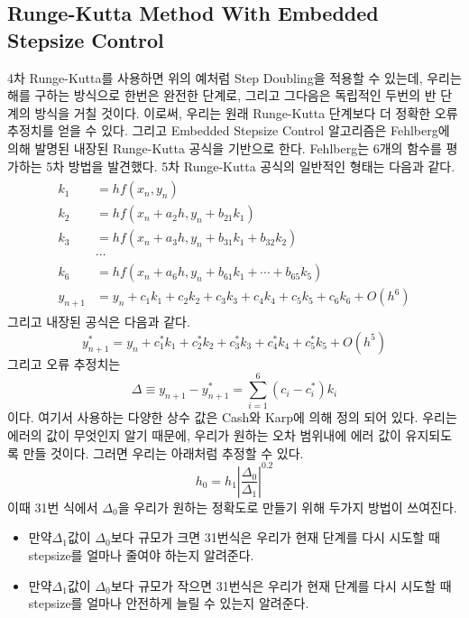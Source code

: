 \documentclass[11pt]{article}
\begin{document}
\subsection{Runge-Kutta Method With Embedded Stepsize Control}
4차 Runge-Kutta를 사용하면 위의 예처럼 Step Doubling을 적용할 수 있는데, 우리는 해를 구하는 방식으로 한번은 완전한 단계로, 그리고 그다음은 독립적인 두번의 반 단계의 방식을 거칠 것이다. 이로써, 우리는 원래 Runge-Kutta 단계보다 더 정확한 오류 추정치를 얻을 수 있다. 그리고 Embedded Stepsize Control 알고리즘은 Fehlberg에 의해 발명된 내장된 Runge-Kutta 공식을 기반으로 한다. Fehlberg는 6개의 함수를 평가하는 5차 방법을 발견했다. 5차 Runge-Kutta 공식의 일반적인 형태는 다음과 같다.
\begin{equation}
\begin{split}
\begin{aligned}
k_1 &= h f(x_n, y_n) \\
k_2 &= h f(x_n + a_2 h, y_n + b_{21} k_1) \\
k_3 &= h f(x_n + a_3 h, y_n + b_{31} k_1 + b_{32} k_2) \\
    & \cdots \\
k_6 &= h f(x_n + a_6 h, y_n + b_{61} k_1 + \cdots + b_{65} k_5) \\
y_{n + 1} &= y_n + c_1 k_1 + c_2 k_2 + c_3 k_3 + c_4 k_4 + c_5 k_5 + c_6 k_6 + O(h^6)
\end{aligned}
\end{split}
\end{equation}
그리고 내장된 공식은 다음과 같다.
\begin{equation}
y_{n + 1}^* = y_n + c_1^* k_1 + c_2^* k_2 + c_3^* k_3 + c_4^* k_4 + c_5^* k_5 + O(h^5)
\end{equation}
그리고 오류 추정치는
\begin{equation}
\Delta \equiv y_{n + 1} - y_{n + 1}^* = \sum_{i = 1}^{6} \left(c_i - c_i^*\right) k_i
\end{equation}
이다. 여기서 사용하는 다양한 상수 값은 Cash와 Karp에 의해 정의 되어 있다. 우리는 에러의 값이 무엇인지 알기 때문에, 우리가 원하는 오차 범위내에 에러 값이 유지되도록 만들 것이다. 그러면 우리는 아래처럼 추정할 수 있다.
\begin{equation}
h_0 = h_1 \left| \frac{\Delta_0}{\Delta_1} \right|^{0.2}
\end{equation}
이때 31번 식에서 $\Delta_0$을 우리가 원하는 정확도로 만들기 위해 두가지 방법이 쓰여진다.
\begin{itemize}
\item 만약$ \Delta_1$값이 $\Delta_0$보다 규모가 크면 31번식은 우리가 현재 단계를 다시 시도할 때 stepsize를 얼마나 줄여야 하는지 알려준다.
\item 만약$ \Delta_1$값이 $\Delta_0$보다 규모가 작으면 31번식은 우리가 현재 단계를 다시 시도할 때 stepsize를 얼마나 안전하게 늘릴 수 있는지 알려준다.\end{itemize}
\pagebreak
\end{document}
